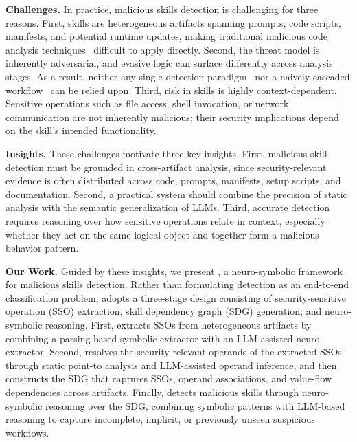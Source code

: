 \noindent \textbf{Challenges.} In practice, malicious skills detection is challenging for three reasons. First, skills are heterogeneous artifacts spanning prompts, code scripts, manifests, and potential runtime updates, making traditional malicious code analysis techniques~\cite{wang2025malpacdetector,duan2021maloss,zheng2024oscar,sun2024em4py,gao2024malguard,zhang2025killing,cheng2024donapi,yu2024maltracker} difficult to apply directly. Second, the threat model is inherently adversarial, and evasive logic can surface differently across analysis stages. As a result, neither any single detection paradigm~\cite{clawscan,goplus-agentguard} nor a naively cascaded workflow~\cite{liu2026maliciousagentskillswild,cisco-skill-scanner} can be relied upon. Third, risk in skills is highly context-dependent. Sensitive operations such as file access, shell invocation, or network communication are not inherently malicious; their security implications depend on the skill’s intended functionality.

\noindent \textbf{Insights.} These challenges motivate three key insights. First, malicious skill detection must be grounded in cross-artifact analysis, since security-relevant evidence is often distributed across code, prompts, manifests, setup scripts, and documentation. Second, a practical system should combine the precision of static analysis with the semantic generalization of LLMs. Third, accurate detection requires reasoning over how sensitive operations relate in context, especially whether they act on the same logical object and together form a malicious behavior pattern.

\noindent \textbf{Our Work.} Guided by these insights, we present \toolname, a neuro-symbolic framework for malicious skills detection. Rather than formulating detection as an end-to-end classification problem, \toolname adopts a three-stage design consisting of security-sensitive operation (SSO) extraction, skill dependency graph (SDG) generation, and neuro-symbolic reasoning. First, \toolname extracts SSOs from heterogeneous artifacts by combining a parsing-based symbolic extractor with an LLM-assisted neuro extractor. Second, \toolname resolves the security-relevant operands of the extracted SSOs through static point-to analysis and LLM-assisted operand inference, and then constructs the SDG that captures SSOs, operand associations, and value-flow dependencies across artifacts. Finally, \toolname detects malicious skills through neuro-symbolic reasoning over the SDG, combining symbolic patterns with LLM-based reasoning to capture incomplete, implicit, or previously unseen suspicious workflows.

